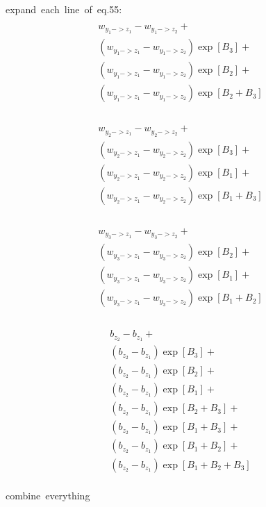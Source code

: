 \documentclass{article}
\begin{document}
\hbox{expand each line of eq.55: }
\begin{multline}\\
    w_{y_1->z_1} - w_{y_1->z_2} +\\
    (w_{y_1->z_1} - w_{y_1->z_2})\exp[B_3] + \\
    (w_{y_1->z_1} - w_{y_1->z_2})\exp[B_2] + \\
    (w_{y_1->z_1} - w_{y_1->z_2})\exp[B_2+B_3] \\
\end{multline}

\begin{multline}\\
    w_{y_2->z_1} - w_{y_2->z_2} + \\
    (w_{y_2->z_1} - w_{y_2->z_2})\exp[B_3] +\\
    (w_{y_2->z_1} - w_{y_2->z_2})\exp[B_1] +\\
    (w_{y_2->z_1} - w_{y_2->z_2})\exp[B_1+B_3]\\
\end{multline}

\begin{multline}\\
    w_{y_3->z_1} - w_{y_3->z_2} +\\
    (w_{y_3->z_1} - w_{y_3->z_2})\exp[B_2] +\\
    (w_{y_3->z_1} - w_{y_3->z_2})\exp[B_1] +\\
    (w_{y_3->z_1} - w_{y_3->z_2})\exp[B_1+B_2]\\     
\end{multline}

\begin{multline}\\
    b_{z_2} - b_{z_1} +\\
    (b_{z_2} - b_{z_1})\exp[B_3] +\\
    (b_{z_2} - b_{z_1})\exp[B_2] +\\
    (b_{z_2} - b_{z_1})\exp[B_1] +\\
    (b_{z_2} - b_{z_1})\exp[B_2+B_3] +\\
    (b_{z_2} - b_{z_1})\exp[B_1+B_3] +\\
    (b_{z_2} - b_{z_1})\exp[B_1+B_2] +\\
    (b_{z_2} - b_{z_1})\exp[B_1+B_2+B_3]\\
\end{multline}

\hbox{combine everything}
\end{document}
